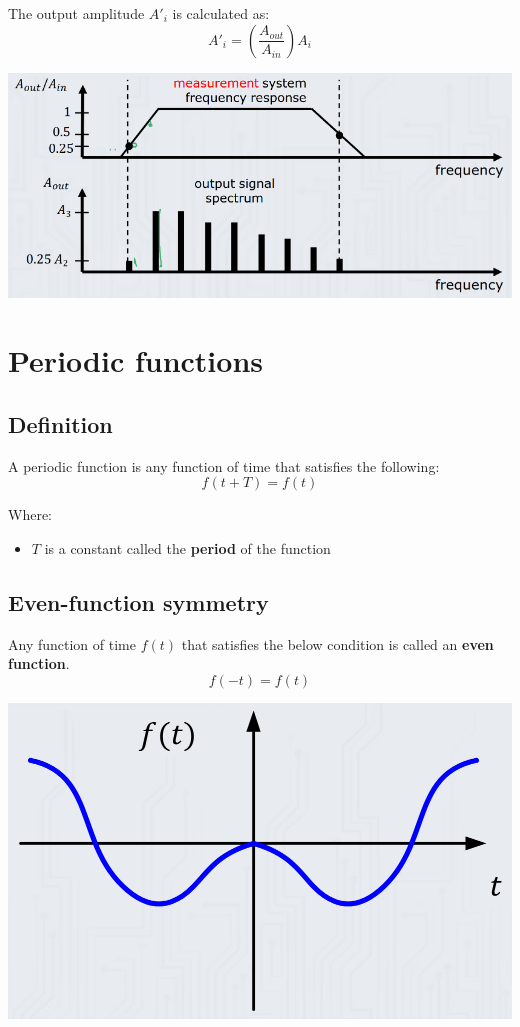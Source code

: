 \documentclass[11pt]{article}
\begin{document}
The output amplitude \(A'_i\) is calculated as:
\[A'_i = \left( \frac{A_{out}}{A_{in}} \right) A_i\]

\begin{center}
\includegraphics[width=.9\linewidth]{./images/bandwidth-example-measurement-system-frequency-response-and-output-signal-spectrum.png}
\end{center}
\section{Periodic functions}
\label{sec:orgd944641}

\subsection{Definition}
\label{sec:orgebf2b8a}
A periodic function is any function of time that satisfies the following:
\[f(t + T) = f(t)\]

Where:
\begin{itemize}
\item \(T\) is a constant called the \textbf{period} of the function
\end{itemize}
\subsection{Even-function symmetry}
\label{sec:orge778842}
Any function of time \(f(t)\) that satisfies the below condition is called an \textbf{even function}.
\[f(-t) = f(t)\]

\begin{center}
\includegraphics[width=.9\linewidth]{./images/even-function-symmetry.png}
\end{center}
\end{document}
